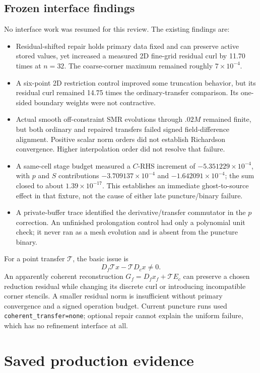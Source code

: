 \documentclass[11pt,letterpaper]{article}
\begin{document}
\subsection{Frozen interface findings}
No interface work was resumed for this review. The existing findings are:
\begin{itemize}
\item Residual-shifted repair holds primary data fixed and can preserve active stored values, yet increased a measured 2D fine-grid residual curl by 11.70 times at $n=32$. The coarse-corner maximum remained roughly $7\times10^{-4}$.
\item A six-point 2D restriction control improved some truncation behavior, but its residual curl remained 14.75 times the ordinary-transfer comparison. Its one-sided boundary weights were not contractive.
\item Actual smooth off-constraint SMR evolutions through $.02M$ remained finite, but both ordinary and repaired transfers failed signed field-difference alignment. Positive scalar norm orders did not establish Richardson convergence. Higher interpolation order did not resolve that failure.
\item A same-cell stage budget measured a $C$-RHS increment of $-5.351229\times10^{-4}$, with $p$ and $S$ contributions $-3.709137\times10^{-4}$ and $-1.642091\times10^{-4}$; the sum closed to about $1.39\times10^{-17}$. This establishes an immediate ghost-to-source effect in that fixture, not the cause of either late puncture/binary failure.
\item A private-buffer trace identified the derivative/transfer commutator in the $p$ correction. An unfinished prolongation control had only a polynomial unit check; it never ran as a mesh evolution and is absent from the puncture binary.
\end{itemize}
For a point transfer $\mathcal T$, the basic issue is
\begin{equation}
D_f\mathcal T x-\mathcal T D_cx\ne0.
\end{equation}
An apparently coherent reconstruction $G_f=D_fx_f+\mathcal T E_c$ can preserve a chosen reduction residual while changing its discrete curl or introducing incompatible corner stencils. A smaller residual norm is insufficient without primary convergence and a signed operation budget. Current puncture runs used \texttt{coherent\_transfer=none}; optional repair cannot explain the uniform failure, which has no refinement interface at all.

\section{Saved production evidence}
\end{document}
